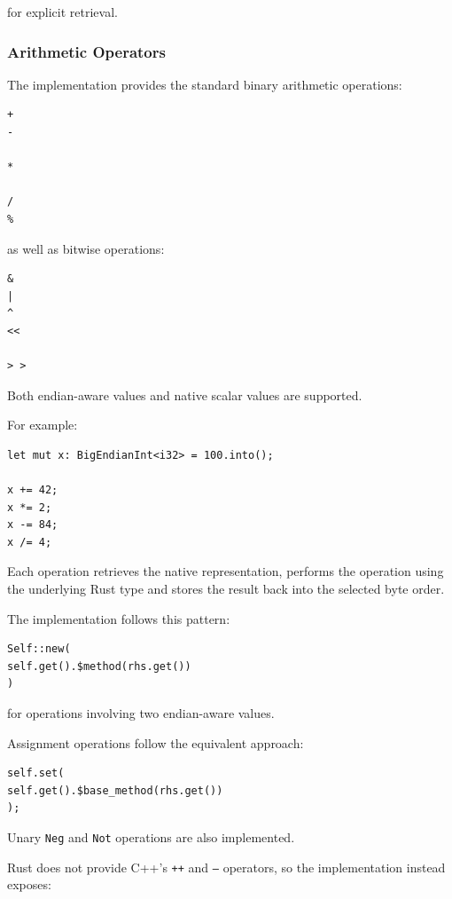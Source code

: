 for explicit retrieval.

\subsubsection{Arithmetic Operators}

The implementation provides the standard binary arithmetic operations:

\begin{lstlisting}[style=rustblock]
+
-

*

/
%
\end{lstlisting}

as well as bitwise operations:

\begin{lstlisting}[style=rustblock]
&
|
^
<<

> >

\end{lstlisting}

Both endian-aware values and native scalar values are supported.

For example:

\begin{lstlisting}[style=rustblock]
let mut x: BigEndianInt<i32> = 100.into();

x += 42;
x *= 2;
x -= 84;
x /= 4;
\end{lstlisting}

Each operation retrieves the native representation, performs the operation using the underlying Rust type 
and stores the result back into the selected byte order.

The implementation follows this pattern:

\begin{lstlisting}[style=rustblock]
Self::new(
self.get().$method(rhs.get())
)
\end{lstlisting}

for operations involving two endian-aware values.

Assignment operations follow the equivalent approach:

\begin{lstlisting}[style=rustblock]
self.set(
self.get().$base_method(rhs.get())
);
\end{lstlisting}

Unary \texttt{Neg} and \texttt{Not} operations are also implemented.

Rust does not provide C++'s \texttt{++} and \texttt{--} operators, so the implementation instead exposes:

